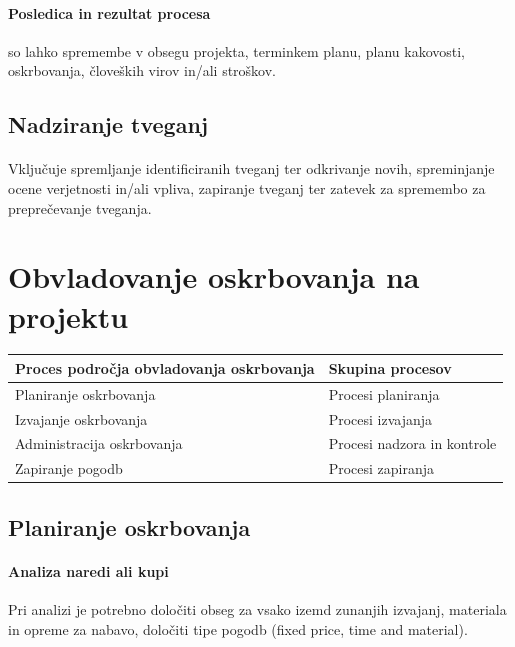 \documentclass[a4paper,12pt]{report}
\begin{document}
         \paragraph{Posledica in rezultat procesa} so lahko spremembe v obsegu projekta, terminkem planu, planu kakovosti, oskrbovanja, človeških virov in/ali stroškov.
      
      \subsection{Nadziranje tveganj}
         \paragraph{} Vključuje spremljanje identificiranih tveganj ter odkrivanje novih, spreminjanje ocene verjetnosti in/ali vpliva, zapiranje tveganj ter zatevek za spremembo za preprečevanje tveganja.

   \section{Obvladovanje oskrbovanja na projektu}
      \begin{center}
         \begin{tabular}{|l|l|}
            \hline
            \textbf{Proces področja obvladovanja oskrbovanja} & \textbf{Skupina procesov} \\
            \hline
            \hline
            Planiranje oskrbovanja & Procesi planiranja \\
            \hline
            Izvajanje oskrbovanja & Procesi izvajanja \\
            \hline
            Administracija oskrbovanja & Procesi nadzora in kontrole \\
            \hline
            Zapiranje pogodb & Procesi zapiranja \\
            \hline
         \end{tabular}
      \end{center}

      \subsection{Planiranje oskrbovanja}
         \paragraph{Analiza naredi ali kupi} Pri analizi je potrebno določiti obseg za vsako izemd zunanjih izvajanj, materiala in opreme za nabavo, določiti tipe pogodb (fixed price, time and material).
\end{document}
